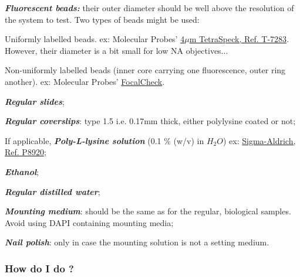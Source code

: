 \documentclass[a4paper, 11pt]{report}%
\begin{document}
\begin{itemize*}
	\item \textbf{\textit{Fluorescent beads:}} their outer diameter should be well above the resolution of the system to test. Two types of beads might be used:
		\begin{itemize*}
			\item Uniformly labelled beads. ex: Molecular Probes' \href{http://probes.invitrogen.com/media/pis/mp07279.pdf}{4$\mu$m TetraSpeck, Ref. T-7283}. However, their diameter is a bit small for low NA objectives...
			\item Non-uniformly labelled beads (inner core carrying one fluorescence, outer ring another). ex: Molecular Probes' \href{http://probes.invitrogen.com/media/pis/mp07234.pdf}{FocalCheck}. 
		\end{itemize*}
	\item \textbf{\textit{Regular slides}};
	\item \textbf{\textit{Regular coverslips}}: type 1.5 i.e. 0.17mm thick, either polylysine coated or not;
	\item If applicable, \textbf{\textit{Poly-L-lysine solution}} (0.1 \% (w/v) in $H_{2}O$) ex: \href{http://www.sigmaaldrich.com/etc/medialib/docs/Sigma/generalinformation2/p8920.Par.0001.File.tmp/p8920.pdf}{Sigma-Aldrich, Ref. P8920};
	\item \textbf{\textit{Ethanol}};
	\item \textbf{\textit{Regular distilled water}};
	\item \textbf{\textit{Mounting medium}}: should be the same as for the regular, biological samples. Avoid using DAPI containing mounting media;
	\item \textbf{\textit{Nail polish}}: only in case the mounting solution is not a setting medium.
\end{itemize*}

\subsubsection{How do I do ?}
\label{sec:gcoar-proto-how}
\end{document}
